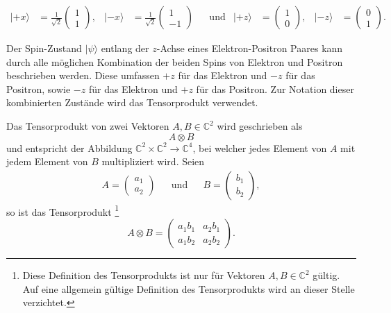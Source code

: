 \begin{refsection}
\begin{align}
    |{+}x\rangle &= \frac{1}{\sqrt{2}}\begin{pmatrix} 1\\1 \end{pmatrix}, &
    |{-}x\rangle &= \frac{1}{\sqrt{2}}\begin{pmatrix} 1\\-1 \end{pmatrix} &
    & \text{und} & 
    |{+}z\rangle &= \begin{pmatrix} 1\\0 \end{pmatrix}, &
    |{-}z\rangle &= \begin{pmatrix} 0\\1 \end{pmatrix}. &
\end{align}

Der Spin-Zustand $|\psi\rangle$ entlang der $z$-Achse eines 
Elektron-Positron Paares  kann durch alle m\"oglichen Kombination der beiden
Spins von Elektron und Positron beschrieben werden. 
Diese umfassen $+z$ f\"ur das Elektron und $-z$
f\"ur das Positron, sowie $-z$ f\"ur das Elektron und $+z$ f\"ur das Positron.
Zur Notation dieser kombinierten Zust\"ande wird das Tensorprodukt verwendet.

\begin{definition}\label{def:bell:tensorprodukt}
    Das Tensorprodukt von zwei Vektoren $A,B \in \mathbb{C}^2$  wird geschrieben als
    \[
        A \otimes B
    \]
    und entspricht der Abbildung $\mathbb{C}^2\times\mathbb{C}^2\to\mathbb{C}^4$, 
    bei welcher jedes Element von $A$ mit jedem Element von $B$ multipliziert
    wird.
    Seien
    \begin{align*}
        A = \begin{pmatrix} a_{1} \\ a_{2} \end{pmatrix}
        && \text{und} &&
        B = \begin{pmatrix} b_{1} \\ b_{2} \end{pmatrix},
    \end{align*}
    so ist das Tensorprodukt 
    \footnote{Diese Definition des Tensorprodukts ist nur f\"ur Vektoren
        $A,B \in \mathbb{C}^2$ g\"ultig. Auf eine allgemein g\"ultige Definition
        des Tensorprodukts wird an dieser Stelle verzichtet.}
    \[
        A \otimes B = \begin{pmatrix} 
        a_1 b_1 & a_2 b_1 \\ a_1 b_2 & a_2 b_2
        \end{pmatrix}.
    \]
\end{definition}


\end{refsection}
